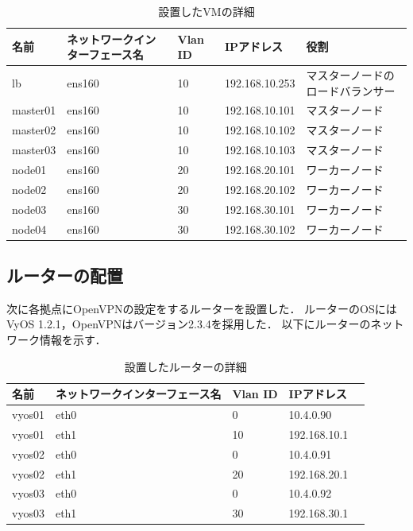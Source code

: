 \begin{landscape}
  \begin{table}[htb]
    \begin{center}
      \caption{設置したVMの詳細}
      \begin{tabular}{|l|l|l|l|l|} \hline
        名前 & ネットワークインターフェース名 & Vlan ID & IPアドレス & 役割 \\ \hline
        lb & ens160 & 10 & 192.168.10.253 & マスターノードのロードバランサー \\ \hline
        master01 & ens160 & 10 & 192.168.10.101 & マスターノード \\ \hline
        master02 & ens160 & 10 & 192.168.10.102 & マスターノード \\ \hline
        master03 & ens160 & 10 & 192.168.10.103 & マスターノード \\ \hline
        node01 & ens160 & 20 & 192.168.20.101 & ワーカーノード \\ \hline
        node02 & ens160 & 20 & 192.168.20.102 & ワーカーノード \\ \hline
        node03 & ens160 & 30 & 192.168.30.101 & ワーカーノード \\ \hline
        node04 & ens160 & 30 & 192.168.30.102 & ワーカーノード \\ \hline
      \end{tabular}
    \end{center}
  \end{table}
\end{landscape}

\subsection{ルーターの配置}

次に各拠点にOpenVPNの設定をするルーターを設置した．
ルーターのOSにはVyOS 1.2.1，OpenVPNはバージョン2.3.4を採用した．
以下にルーターのネットワーク情報を示す．

\begin{table}[htb]
  \begin{center}
    \caption{設置したルーターの詳細}
    \begin{tabular}{|l|l|l|l|l|} \hline
      名前 & ネットワークインターフェース名 & Vlan ID & IPアドレス \\ \hline
      vyos01 & eth0 & 0 & 10.4.0.90 \\ \hline
      vyos01 & eth1 & 10 & 192.168.10.1 \\ \hline
      vyos02 & eth0 & 0 & 10.4.0.91 \\ \hline
      vyos02 & eth1 & 20 & 192.168.20.1 \\ \hline
      vyos03 & eth0 & 0 & 10.4.0.92 \\ \hline
      vyos03 & eth1 & 30 & 192.168.30.1 \\ \hline
    \end{tabular}
  \end{center}
\end{table}

